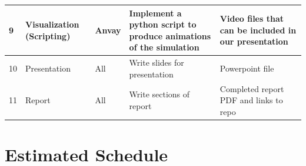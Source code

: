 \documentclass[letterpaper]{article}
\begin{document}
\begin{table}[H]
{\begin{tabular}{|p{0.25cm}|p{4cm}|p{2.3cm}|p{6cm}|p{4cm}|}
     9 & Visualization (Scripting)& Anvay & Implement a python script to produce animations of the simulation & Video files that can be included in our presentation\\\hline
     
     10 & Presentation& All & Write slides for presentation  & Powerpoint file \\\hline
     
     11 & Report& All & Write sections of report  &  Completed report PDF and links to repo\\\hline
    \end{tabular}
    }
\end{table}


\section*{Estimated Schedule}
\end{document}
